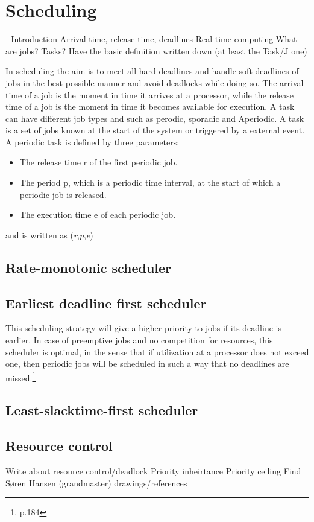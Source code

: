 \section{Scheduling} \label{sc:scheduling}

- Introduction
Arrival time, release time, deadlines
Real-time computing
What are jobs? Tasks?
Have the basic definition written down (at least the Task/J one)


In scheduling the aim is to meet all hard deadlines and handle soft deadlines of jobs in the best possible manner and avoid deadlocks while doing so. The arrival time of a job is the moment in time it arrives at a processor, while the
release time of a job is the moment in time it becomes available for execution. A task can have different job types and such as perodic, sporadic and Aperiodic. A task is a set of jobs known at the start of the system or triggered by a external event.
A periodic task is defined by three parameters:
\begin{itemize}
	\item The release time r of the first periodic job.
	\item The period p, which is a periodic time interval, at the start of which a periodic job is released.
	\item The execution time e of each periodic job.
\end{itemize}
and is written as (\textit{r},\textit{p},\textit{e})

\subsection{Rate-monotonic scheduler}


\subsection{Earliest deadline first scheduler}
This scheduling strategy will give a higher priority to jobs if its deadline is
earlier. In case of preemptive jobs and no competition for resources, this scheduler
is optimal, in the sense that if utilization at a processor does not exceed one, then
periodic jobs will be scheduled in such a way that no deadlines are missed.\footnote{\cite{Fokkink1965} p.184}



\subsection{Least-slacktime-first scheduler}


\subsection{Resource control}
Write about resource control/deadlock
Priority inheirtance
Priority ceiling
Find Søren Hansen (grandmaster) drawings/references